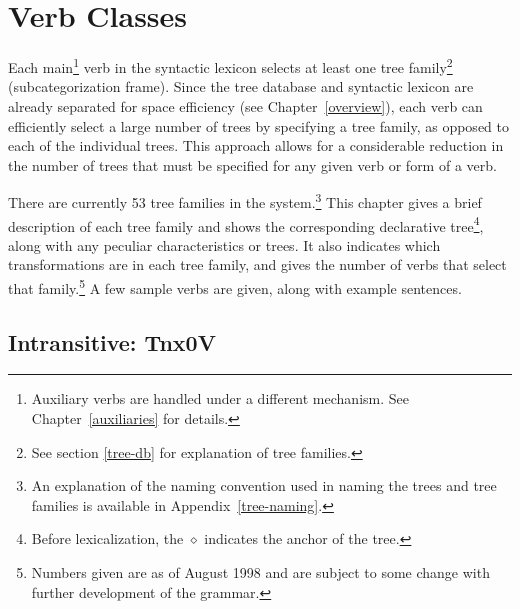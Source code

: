  
\chapter{Verb Classes} 
\label{verb-classes} 
 
Each main\footnote{Auxiliary verbs are handled under a different mechanism.  See Chapter~\ref{auxiliaries} for details.} verb in the 
syntactic lexicon selects at least one tree family\footnote{See section \ref{tree-db} for explanation of tree families.} 
(subcategorization frame).  Since the tree database and syntactic 
lexicon are already separated for space efficiency (see 
Chapter~\ref{overview}), each verb can efficiently select a large 
number of trees by specifying a tree family, as opposed to each of the 
individual trees.  This approach allows for a considerable reduction 
in the number of trees that must be specified for any given verb or 
form of a verb. 
 
There are currently 53 tree families in the system.\footnote{An   explanation of the naming convention used in naming the trees and   tree families is available in Appendix~\ref{tree-naming}.}  This 
chapter gives a brief description of each tree family and shows the 
corresponding declarative tree\footnote{Before lexicalization, the   $\diamond$ indicates the anchor of the tree.}, along with any 
peculiar characteristics or trees.  It also indicates which 
transformations are in each tree family, and gives the number of verbs 
that select that family.\footnote{Numbers given are as of August 1998   and are subject to some change with further development of the   grammar.} A few sample verbs are given, along with example 
sentences. 
 
 
\section{Intransitive: Tnx0V} 
\label{nx0V-family} 
 
